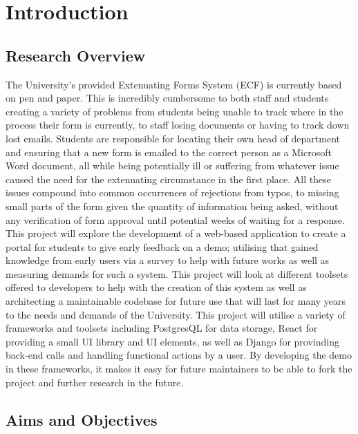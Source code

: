 \chapter{Introduction}

\section{Research Overview}

The University's provided Extenuating Forms System (ECF) is currently based on pen and paper. This is incredibly cumbersome to both staff and students creating a variety of problems from students being unable to track where in the process their form is currently, to staff losing documents or having to track down lost emails. Students are responsible for locating their own head of department and ensuring that a new form is emailed to the correct person as a Microsoft Word document, all while being potentially ill or suffering from whatever issue caused the need for the extenuating circumstance in the first place. All these issues compound into common occurrences of rejections from typos, to missing small parts of the form given the quantity of information being asked, without any verification of form approval until potential weeks of waiting for a response.
\newline
\newline
This project will explore the development of a web-based application to create a portal for students to give early feedback on a demo; utilising that gained knowledge from early users via a survey to help with future works as well as measuring demands for such a system. This project will look at different toolsets offered to developers to help with the creation of this system as well as architecting a maintainable codebase for future use that will last for many years to the needs and demands of the University. This project will utilise a variety of frameworks and toolsets including PostgresQL for data storage, React for providing a small UI library and UI elements, as well as Django for provinding back-end calls and handling functional actions by a user. By developing the demo in these frameworks, it makes it easy for future maintainers to be able to fork the project and further research in the future.

\pagebreak

\section{Aims and Objectives}

